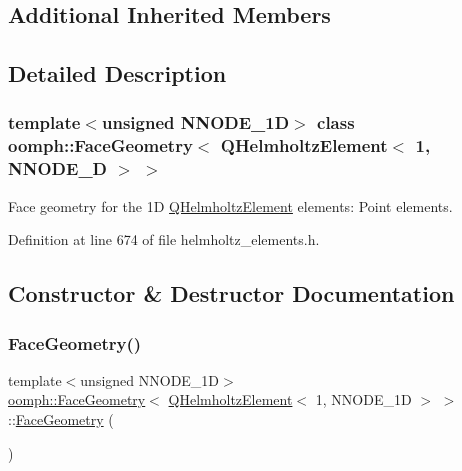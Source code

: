 \subsection*{Additional Inherited Members}


\subsection{Detailed Description}
\subsubsection*{template$<$unsigned N\+N\+O\+D\+E\+\_\+1D$>$\newline
class oomph\+::\+Face\+Geometry$<$ Q\+Helmholtz\+Element$<$ 1, N\+N\+O\+D\+E\+\_\+D $>$ $>$}

Face geometry for the 1D \hyperlink{classoomph_1_1QHelmholtzElement}{Q\+Helmholtz\+Element} elements\+: Point elements. 

Definition at line 674 of file helmholtz\+\_\+elements.\+h.



\subsection{Constructor \& Destructor Documentation}
\mbox{\label{classoomph_1_1FaceGeometry_3_01QHelmholtzElement_3_011_00_01NNODE__1D_01_4_01_4_a81ca6e17dc0549a2880f30e57313be20}} 
\subsubsection{\texorpdfstring{Face\+Geometry()}{FaceGeometry()}}
{\footnotesize\ttfamily template$<$unsigned N\+N\+O\+D\+E\+\_\+1D$>$ \\
\hyperlink{classoomph_1_1FaceGeometry}{oomph\+::\+Face\+Geometry}$<$ \hyperlink{classoomph_1_1QHelmholtzElement}{Q\+Helmholtz\+Element}$<$ 1, N\+N\+O\+D\+E\+\_\+1D $>$ $>$\+::\hyperlink{classoomph_1_1FaceGeometry}{Face\+Geometry} (\begin{DoxyParamCaption}{ }\end{DoxyParamCaption})\hspace{0.3cm}{\ttfamily [inline]}}



